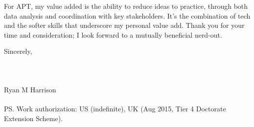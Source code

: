 \documentclass[a4paper]{../res}
\begin{document}
\begin{sloppypar}
\begin{resume}


For APT, my value added is the ability to reduce ideas to practice, through both data analysis and coordination with key stakeholders. It's the combination of tech and the softer skills that underscore my personal value add. Thank you for your time and consideration; I look forward to a mutually beneficial nerd-out. 


Sincerely,
\\ \\ \\ \\
Ryan M Harrison \\ \\
PS. Work authorization: US (indefinite), UK (Aug 2015, Tier 4 Doctorate Extension Scheme).

\end{resume} 
\end{sloppypar}
\end{document}
